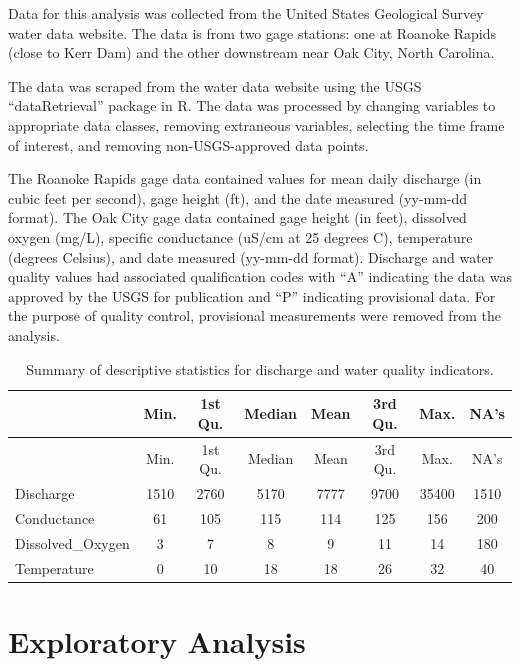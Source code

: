 \documentclass[12pt,]{article}
\begin{document}
Data for this analysis was collected from the United States Geological
Survey water data website. The data is from two gage stations: one at
Roanoke Rapids (close to Kerr Dam) and the other downstream near Oak
City, North Carolina.

The data was scraped from the water data website using the USGS
``dataRetrieval'' package in R. The data was processed by changing
variables to appropriate data classes, removing extraneous variables,
selecting the time frame of interest, and removing non-USGS-approved
data points.

The Roanoke Rapids gage data contained values for mean daily discharge
(in cubic feet per second), gage height (ft), and the date measured
(yy-mm-dd format). The Oak City gage data contained gage height (in
feet), dissolved oxygen (mg/L), specific conductance (uS/cm at 25
degrees C), temperature (degrees Celsius), and date measured (yy-mm-dd
format). Discharge and water quality values had associated qualification
codes with ``A'' indicating the data was approved by the USGS for
publication and ``P'' indicating provisional data. For the purpose of
quality control, provisional measurements were removed from the
analysis.

\begin{longtable}[]{@{}lccccccc@{}}
\caption{Summary of descriptive statistics for discharge and water
quality indicators.}\tabularnewline
\toprule
& Min. & 1st Qu. & Median & Mean & 3rd Qu. & Max. & NA's\tabularnewline
\midrule
\endfirsthead
\toprule
& Min. & 1st Qu. & Median & Mean & 3rd Qu. & Max. & NA's\tabularnewline
\midrule
\endhead
Discharge & 1510 & 2760 & 5170 & 7777 & 9700 & 35400 &
1510\tabularnewline
Conductance & 61 & 105 & 115 & 114 & 125 & 156 & 200\tabularnewline
Dissolved\_Oxygen & 3 & 7 & 8 & 9 & 11 & 14 & 180\tabularnewline
Temperature & 0 & 10 & 18 & 18 & 26 & 32 & 40\tabularnewline
\bottomrule
\end{longtable}

\newpage

\hypertarget{exploratory-analysis}{%
\section{Exploratory Analysis}\label{exploratory-analysis}}
\end{document}

